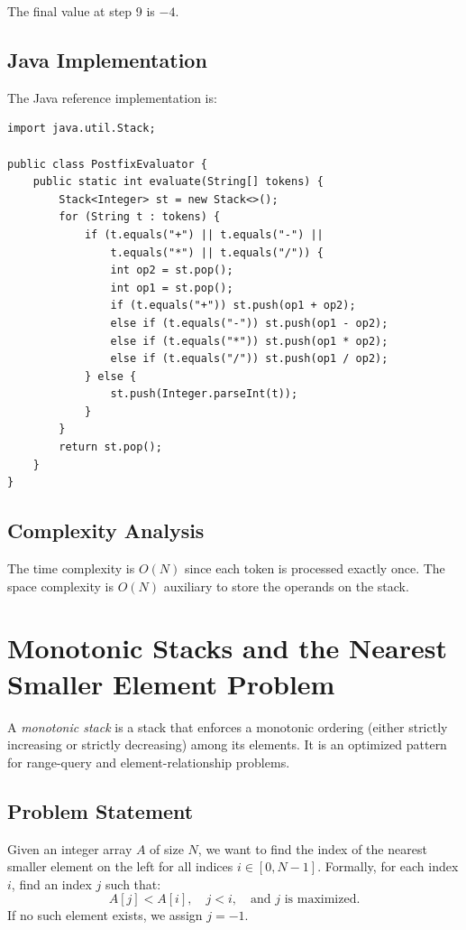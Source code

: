 \documentclass[10pt,journal,compsoc,onecolumn]{IEEEtran}
\begin{document}
The final value at step 9 is $-4$.

\subsection{Java Implementation}
The Java reference implementation is:
\begin{verbatim}
import java.util.Stack;

public class PostfixEvaluator {
    public static int evaluate(String[] tokens) {
        Stack<Integer> st = new Stack<>();
        for (String t : tokens) {
            if (t.equals("+") || t.equals("-") || 
                t.equals("*") || t.equals("/")) {
                int op2 = st.pop();
                int op1 = st.pop();
                if (t.equals("+")) st.push(op1 + op2);
                else if (t.equals("-")) st.push(op1 - op2);
                else if (t.equals("*")) st.push(op1 * op2);
                else if (t.equals("/")) st.push(op1 / op2);
            } else {
                st.push(Integer.parseInt(t));
            }
        }
        return st.pop();
    }
}
\end{verbatim}

\subsection{Complexity Analysis}
The time complexity is $O(N)$ since each token is processed exactly once. The space complexity is $O(N)$ auxiliary to store the operands on the stack.

\section{Monotonic Stacks and the Nearest Smaller Element Problem}
A \emph{monotonic stack} is a stack that enforces a monotonic ordering (either strictly increasing or strictly decreasing) among its elements. It is an optimized pattern for range-query and element-relationship problems.

\subsection{Problem Statement}
Given an integer array $A$ of size $N$, we want to find the index of the nearest smaller element on the left for all indices $i \in [0, N-1]$. Formally, for each index $i$, find an index $j$ such that:
\begin{equation}
    A[j] < A[i], \quad j < i, \quad \text{and } j \text{ is maximized.}
\end{equation}
If no such element exists, we assign $j = -1$.
\end{document}
